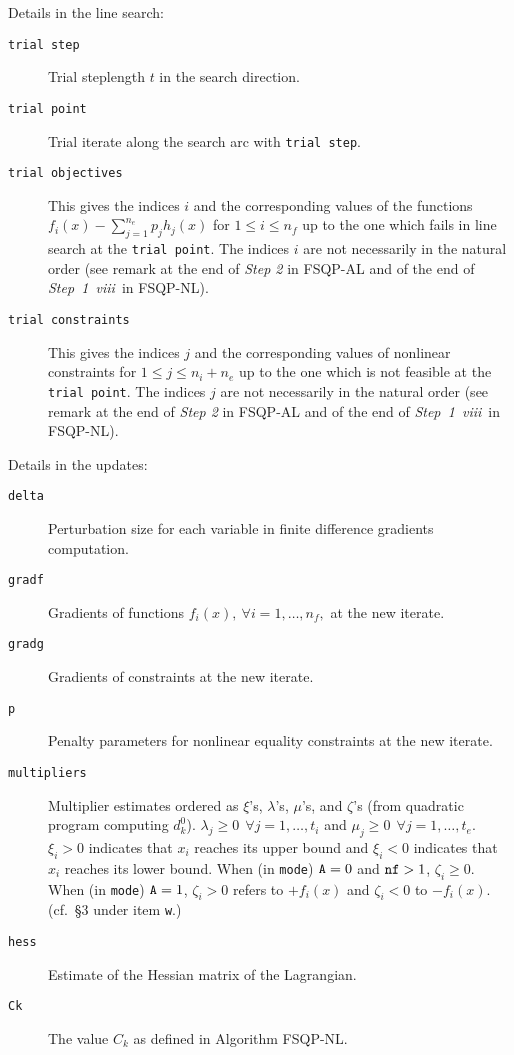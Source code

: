 Details in the line search:
\begin{description}
\item[\tt trial step]  Trial steplength $t$ in the search direction.
\item[\tt trial point] Trial iterate along the search arc 
                       with {\tt trial step}.
\item[\tt trial objectives] This gives the indices $i$ and 
                            the corresponding
                            values of the functions 
                   $f_i(x)-\sum_{j=1}^{n_e}p_jh_j(x)$
                   for $1\leq i \leq n_f$ up to the one which fails 
                   in line search at the {\tt trial point}. The 
                   indices $i$
                   are not necessarily in the natural order (see
                   remark at the end of {\it Step 2} in FSQP-AL and of
                   the end of {\it Step~1~viii}\ in FSQP-NL).
\item[\tt trial constraints] This gives the indices $j$ and the 
                   corresponding values of nonlinear constraints 
                   for $1\leq j \leq n_i+n_e$ up to the 
                   one which is not feasible at the {\tt trial point}.
                   The indices $j$
                   are not necessarily in the natural order (see
                   remark at the end of {\it Step 2} in FSQP-AL and of
                   the end of {\it Step~1~viii}\ in FSQP-NL).
\end{description}

Details in the updates:
\begin{description}
\item[\tt delta]  Perturbation size for each variable 
                  in finite difference gradients computation.
\item[\tt gradf]  Gradients of 
                  functions $f_i(x),~\forall i=1,\ldots,n_f,$ 
                  at the new iterate.
\item[\tt gradg]  Gradients of constraints at the new iterate.
\item[\tt p]      Penalty parameters for nonlinear equality constraints at
                  the new iterate.
\item[\tt multipliers] Multiplier estimates ordered as $\xi$'s, 
        $\lambda$'s, $\mu$'s, and $\zeta$'s (from quadratic program
        computing $d^0_k$). $\lambda _j \geq 0~~\forall j=1,\ldots,t_i$
        and $\mu _j \ge 0~~\forall j=1,\ldots,t_e$. $\xi _i > 0$
        indicates that $x_i$ reaches its upper bound and $\xi _i <0$
        indicates that $x_i$ reaches its lower bound. When
        (in {\tt mode}) ${\tt A}=0$ and ${\tt nf}>1$, $\zeta _i \geq0$.
        When (in {\tt mode}) ${\tt A}=1$, $\zeta _i >0$ refers to
        $+f_i(x)$ and $\zeta _i<0$ to $-f_i(x)$. 
       (cf.\ \S 3 under item {\tt w}.)
\item[\tt hess]   Estimate of the Hessian matrix of the Lagrangian.
\item[\tt Ck]     The value $C_k$ as defined in Algorithm FSQP-NL.
\end{description}

